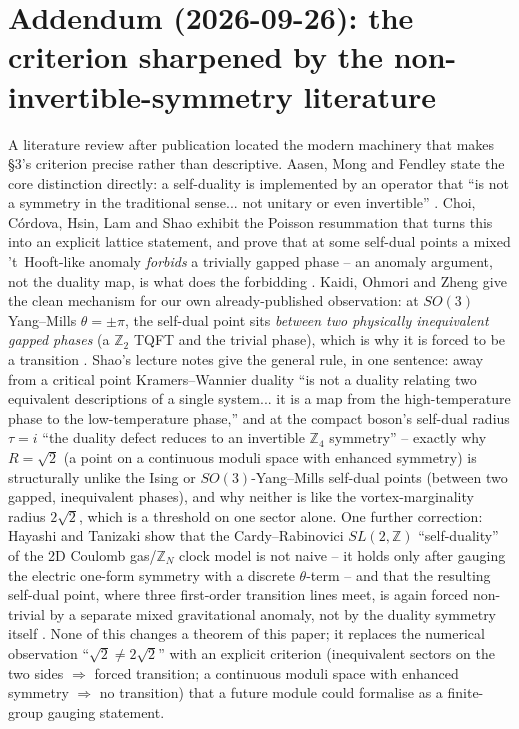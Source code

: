 \documentclass[11pt,a4paper]{article}
\begin{document}
\section*{Addendum (2026-09-26): the criterion sharpened by the non-invertible-symmetry literature}
A literature review after publication located the modern machinery that makes \S3's criterion precise rather
than descriptive. Aasen, Mong and Fendley state the core distinction directly: a self-duality is implemented by
an operator that ``is not a symmetry in the traditional sense... not unitary or even invertible''
\cite{AasenMongFendley2016}. Choi, C\'ordova, Hsin, Lam and Shao exhibit the Poisson resummation that turns this
into an explicit lattice statement, and prove that at some self-dual points a mixed 't~Hooft-like anomaly
\emph{forbids} a trivially gapped phase -- an anomaly argument, not the duality map, is what does the forbidding
\cite{ChoiCordovaHsinLamShao2022}. Kaidi, Ohmori and Zheng give the clean mechanism for our own already-published
observation: at $SO(3)$ Yang--Mills $\theta=\pm\pi$, the self-dual point sits \emph{between two physically
inequivalent gapped phases} (a $\mathbb Z_2$ TQFT and the trivial phase), which is why it is forced to be a
transition \cite{KaidiOhmoriZheng2022}. Shao's lecture notes give the general rule, in one sentence: away from a
critical point Kramers--Wannier duality ``is not a duality relating two equivalent descriptions of a single
system... it is a map from the high-temperature phase to the low-temperature phase,'' and at the compact boson's
self-dual radius $\tau=i$ ``the duality defect reduces to an invertible $\mathbb Z_4$ symmetry'' \cite{Shao2023} --
exactly why $R=\sqrt2$ (a point on a continuous moduli space with enhanced symmetry) is structurally unlike the
Ising or $SO(3)$-Yang--Mills self-dual points (between two gapped, inequivalent phases), and why neither is like
the vortex-marginality radius $2\sqrt2$, which is a threshold on one sector alone. One further correction:
Hayashi and Tanizaki show that the Cardy--Rabinovici $SL(2,\mathbb Z)$ ``self-duality'' of the 2D Coulomb
gas/$\mathbb Z_N$ clock model is not naive -- it holds only after gauging the electric one-form symmetry with a
discrete $\theta$-term -- and that the resulting self-dual point, where three first-order transition lines meet,
is again forced non-trivial by a separate mixed gravitational anomaly, not by the duality symmetry itself
\cite{HayashiTanizaki2022}. None of this changes a theorem of this paper; it replaces the numerical observation
``$\sqrt2\neq2\sqrt2$'' with an explicit criterion (inequivalent sectors on the two sides $\Rightarrow$ forced
transition; a continuous moduli space with enhanced symmetry $\Rightarrow$ no transition) that a future module
could formalise as a finite-group gauging statement.
\end{document}
